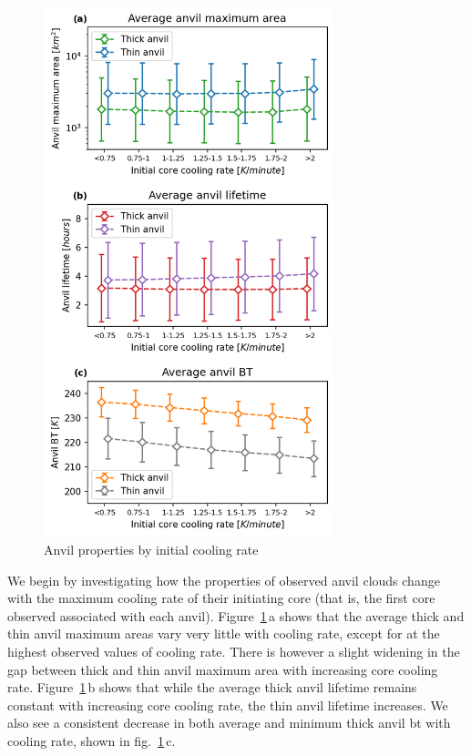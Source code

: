 \begin{figure}[tp]
    \centering
    \includegraphics[width=0.75\textwidth]{figures/ch2_21.png}
    \caption{Anvil properties by initial cooling rate}
    \label{fig:anvil_cooling_rate_properties}
\end{figure}

We begin by investigating how the properties of observed anvil clouds change with the maximum cooling rate of their initiating core (that is, the first core observed associated with each anvil).
Figure~\ref{fig:anvil_cooling_rate_properties}\,a shows that the average thick and thin anvil maximum areas vary very little with cooling rate, except for at the highest observed values of cooling rate.
There is however a slight widening in the gap between thick and thin anvil maximum area with increasing core cooling rate.
Figure~\ref{fig:anvil_cooling_rate_properties}\,b shows that while the average thick anvil lifetime remains constant with increasing core cooling rate, the thin anvil lifetime increases.
We also see a consistent decrease in both average and minimum thick anvil \acrshort{bt} with cooling rate, shown in fig.~\ref{fig:anvil_cooling_rate_properties}\,c.


